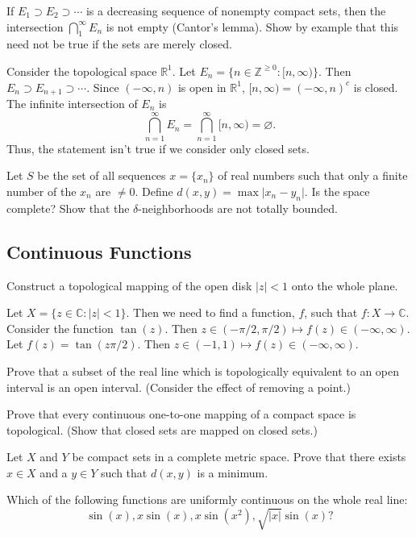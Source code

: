\begin{exercise}
\item
  If \(E_1\supset E_2\supset\cdots\) is a decreasing sequence of nonempty
  compact sets, then the intersection \(\bigcap_1^{\infty}E_n\) is not empty
  (Cantor's lemma).
  Show by example that this need not be true if the sets are merely closed.
  \par\smallskip
  Consider the topological space \(\mathbb{R}^1\).
  Let \(E_n = \{n\in\mathbb{Z}^{\geq 0}\colon [n,\infty)\}\).
  Then \(E_n\supset E_{n + 1}\supset\cdots\).
  Since \((-\infty,n)\) is open in \(\mathbb{R}^1\),
  \([n,\infty) = (-\infty,n)^c\) is closed.
  The infinite intersection of \(E_n\) is
  \[
    \bigcap_{n = 1}^{\infty}E_n = \bigcap_{n = 1}^{\infty}[n, \infty) =
    \varnothing.
  \]
  Thus, the statement isn't true if we consider only closed sets.
\item
  Let \(S\) be the set of all sequences \(x = \{x_n\}\) of real numbers such
  that only a finite number of the \(x_n\) are \(\neq 0\).
  Define \(d(x,y) = \max\lvert x_n - y_n\rvert\).
  Is the space complete?
  Show that the \(\delta\)-neighborhoods are not totally bounded.
\end{exercise}

\subsection{Continuous Functions}

\begin{exercise}
\item
  Construct a topological mapping of the open disk \(\lvert z\rvert < 1\) onto
  the whole plane.
  \par\smallskip
  Let \(X = \{z\in\mathbb{C}\colon\lvert z\rvert < 1\}\).
  Then we need to find a function, \(f\), such that \(f\colon X\to\mathbb{C}\).
  Consider the function \(\tan(z)\).
  Then \(z\in(-\pi/2,\pi/2)\mapsto f(z)\in(-\infty,\infty)\).
  Let \(f(z) = \tan(z\pi/2)\).
  Then \(z\in(-1,1)\mapsto f(z)\in(-\infty,\infty)\).
\item
  Prove that a subset of the real line which is topologically equivalent to an
  open interval is an open interval.
  (Consider the effect of removing a point.)
\item
  Prove that every continuous one-to-one mapping of a compact space is
  topological.
  (Show that closed sets are mapped on closed sets.)
\item
  Let \(X\) and \(Y\) be compact sets in a complete metric space.
  Prove that there exists \(x\in X\) and a \(y\in Y\) such that
  \(d(x,y)\) is a minimum.
\item
  Which of the following functions are uniformly continuous on the whole
  real line:
  \[
    \sin(x),x\sin(x),x\sin(x^2),\sqrt{\lvert x\rvert}\sin(x)\mbox{?}
  \]
\end{exercise}

